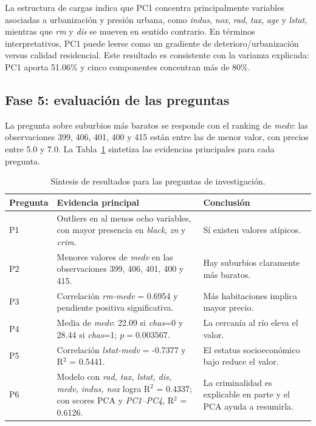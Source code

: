 La estructura de cargas indica que PC1 concentra principalmente variables asociadas a urbanizaci\'on y presi\'on urbana, como \textit{indus}, \textit{nox}, \textit{rad}, \textit{tax}, \textit{age} y \textit{lstat}, mientras que \textit{rm} y \textit{dis} se mueven en sentido contrario. En t\'erminos interpretativos, PC1 puede leerse como un gradiente de deterioro/urbanizaci\'on versus calidad residencial. Este resultado es consistente con la varianza explicada: PC1 aporta 51.06\% y cinco componentes concentran m\'as de 80\%.

\subsection{Fase 5: evaluaci\'on de las preguntas}
La pregunta sobre suburbios m\'as baratos se responde con el ranking de \textit{medv}: las observaciones 399, 406, 401, 400 y 415 est\'an entre las de menor valor, con precios entre 5.0 y 7.0. La Tabla~\ref{tab:respuestas} sintetiza las evidencias principales para cada pregunta.

\begin{table}[htbp]
\centering
\small
\begin{tabular}{p{2.0cm}p{4.9cm}p{5.0cm}}
\toprule
Pregunta & Evidencia principal & Conclusi\'on \\
\midrule
P1 & Outliers en al menos ocho variables, con mayor presencia en \textit{black}, \textit{zn} y \textit{crim}. & S\'i existen valores at\'ipicos. \\
P2 & Menores valores de \textit{medv} en las observaciones 399, 406, 401, 400 y 415. & Hay suburbios claramente m\'as baratos. \\
P3 & Correlaci\'on \textit{rm-medv} = 0.6954 y pendiente positiva significativa. & M\'as habitaciones implica mayor precio. \\
P4 & Media de \textit{medv}: 22.09 si \textit{chas}=0 y 28.44 si \textit{chas}=1; $p=0.003567$. & La cercan\'ia al r\'io eleva el valor. \\
P5 & Correlaci\'on \textit{lstat-medv} = -0.7377 y R$^2$ = 0.5441. & El estatus socioecon\'omico bajo reduce el valor. \\
P6 & Modelo con \textit{rad, tax, lstat, dis, medv, indus, nox} logra R$^2$ = 0.4337; con scores PCA y \textit{PC1--PC4}, R$^2$ = 0.6126. & La criminalidad es explicable en parte y el PCA ayuda a resumirla. \\
\bottomrule
\end{tabular}
\caption{S\'intesis de resultados para las preguntas de investigaci\'on.}
\label{tab:respuestas}
\end{table}

